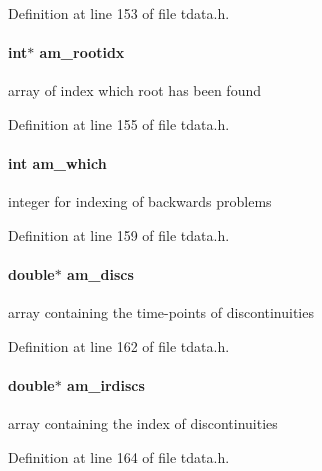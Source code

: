 Definition at line 153 of file tdata.\+h.

\hypertarget{struct_temp_data_a360ea220e712750c92bd3fc8b56230e2}{}
\paragraph[{am\+\_\+rootidx}]{\setlength{\rightskip}{0pt plus 5cm}int$\ast$ am\+\_\+rootidx}\label{struct_temp_data_a360ea220e712750c92bd3fc8b56230e2}
array of index which root has been found 

Definition at line 155 of file tdata.\+h.

\hypertarget{struct_temp_data_a961819e25ceef7e842c469cbedccb19f}{}
\paragraph[{am\+\_\+which}]{\setlength{\rightskip}{0pt plus 5cm}int am\+\_\+which}\label{struct_temp_data_a961819e25ceef7e842c469cbedccb19f}
integer for indexing of backwards problems 

Definition at line 159 of file tdata.\+h.

\hypertarget{struct_temp_data_a236419c9694ba93addaee96e347e84b9}{}
\paragraph[{am\+\_\+discs}]{\setlength{\rightskip}{0pt plus 5cm}double$\ast$ am\+\_\+discs}\label{struct_temp_data_a236419c9694ba93addaee96e347e84b9}
array containing the time-\/points of discontinuities 

Definition at line 162 of file tdata.\+h.

\hypertarget{struct_temp_data_acc5701e8db7a06ab4614f4008da870fe}{}
\paragraph[{am\+\_\+irdiscs}]{\setlength{\rightskip}{0pt plus 5cm}double$\ast$ am\+\_\+irdiscs}\label{struct_temp_data_acc5701e8db7a06ab4614f4008da870fe}
array containing the index of discontinuities 

Definition at line 164 of file tdata.\+h.

